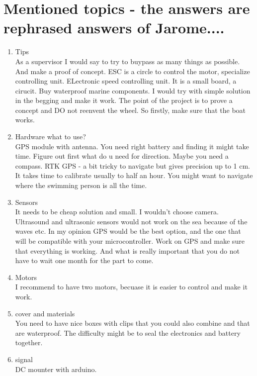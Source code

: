 \documentclass{article}[10pt]
\begin{document}
\section{Mentioned topics - the answers are rephrased answers of Jarome....}
\begin{enumerate}
    \item Tips\\
    As a supervisor I would say to try to buypass as many things as possible. And make a proof of concept. ESC is a circle to control the motor, specialize controlling unit. ELectronic speed controlling unit.
It is a small board, a cirucit. Buy waterproof marine components. I would try with simple solution in the begging and make it work. The point of the project is to prove a concept and DO not reenvent the wheel. So firstly, make sure that the boat works.
    \item Hardware what to use?\\
GPS module with antenna.  You need right battery and finding it might take time. Figure out first what do u need 
for direction. Maybe you need a compass. RTK GPS - a bit tricky to navigate but gives precision up to 1 cm. It takes time to calibrate 
usually to half an hour. You might want to navigate where the swimming person is all the time. \\
    \item Sensors\\
It needs to be cheap solution and small. I wouldn't choose camera. Ultrasound and ultrasonic sensors would not work on the sea because of the waves etc. 
In my opinion GPS would be the best option, and the one that will be compatible with your microcontroller. Work on GPS and make sure that everything is working. 
And what is really important that you do not have to wait one month for the part to come. \\
    \item Motors\\
I recommend to have two motors, becuase it is easier to control and make it work. \\
    \item cover and materials\\
You need to have nice boxes with clips that you could also combine and that are waterproof. The difficulty might be to seal the electronics and battery together.\\
    \item signal\\
DC mounter with arduino. 
\end{enumerate}
\end{document}

